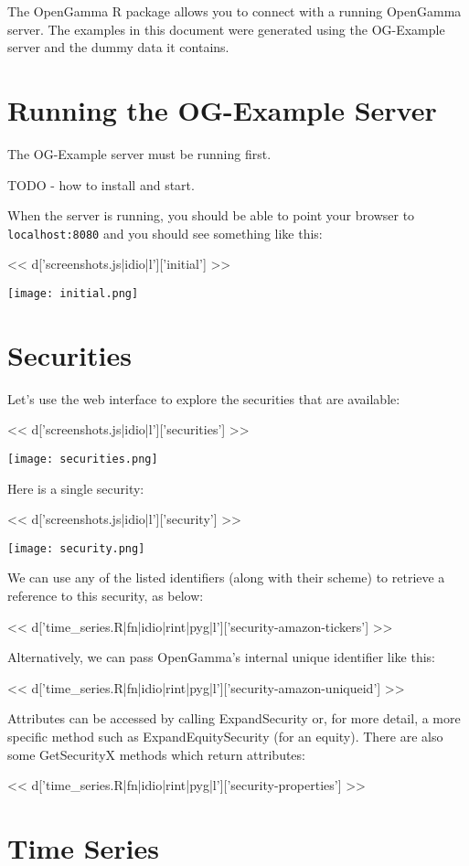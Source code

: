 \documentclass[a4paper]{amsart}
\begin{document}
The OpenGamma R package allows you to connect with a running OpenGamma server. The examples in this document were generated using the OG-Example server and the dummy data it contains.

\section{Running the OG-Example Server}

The OG-Example server must be running first.

TODO - how to install and start.

When the server is running, you should be able to point your browser to \verb|localhost:8080| and you should see something like this:

<< d['screenshots.js|idio|l']['initial'] >>

\texttt{[image: initial.png]}

\section{Securities}

Let's use the web interface to explore the securities that are available:

<< d['screenshots.js|idio|l']['securities'] >>

\texttt{[image: securities.png]}

Here is a single security:

<< d['screenshots.js|idio|l']['security'] >>

\texttt{[image: security.png]}

We can use any of the listed identifiers (along with their scheme) to retrieve a reference to this security, as below:

<< d['time_series.R|fn|idio|rint|pyg|l']['security-amazon-tickers'] >>

Alternatively, we can pass OpenGamma's internal unique identifier like this:

<< d['time_series.R|fn|idio|rint|pyg|l']['security-amazon-uniqueid'] >>

Attributes can be accessed by calling ExpandSecurity or, for more detail, a more specific method such as ExpandEquitySecurity (for an equity). There are also some GetSecurityX methods which return attributes:

<< d['time_series.R|fn|idio|rint|pyg|l']['security-properties'] >>

\section{Time Series}
\end{document}
